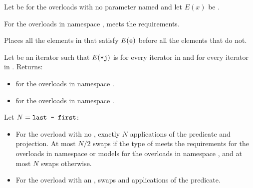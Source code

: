 \begin{itemdescr}
\pnum
Let  be 
for the overloads with no parameter named 
and let $E(x)$ be .

\pnum
\expects
For the overloads in namespace ,
 meets
the  requirements.

\pnum
\effects
Places all the elements  in 
that satisfy $E(\texttt{\protect e})$ before all the elements that do not.

\pnum
\returns
Let  be an iterator such that $E(\texttt{\protect*j})$ is
 for every iterator  in  and
 for every iterator  in .
Returns:
\begin{itemize}
\item {} for the overloads in namespace .
\item {} for the overloads in namespace .
\end{itemize}


\pnum
\complexity
Let $N = \texttt{\protect last - first}$:
\begin{itemize}
\item
  For the overload with no ,
  exactly $N$ applications of the predicate and projection.
  At most $N / 2$ swaps if the type of  meets
  the  requirements
  for the overloads in namespace  or
  models 
  for the overloads in namespace ,
  and at most $N$ swaps otherwise.
\item
  For the overload with an ,
   swaps and  applications of the predicate.
\end{itemize}

\end{itemdescr}

